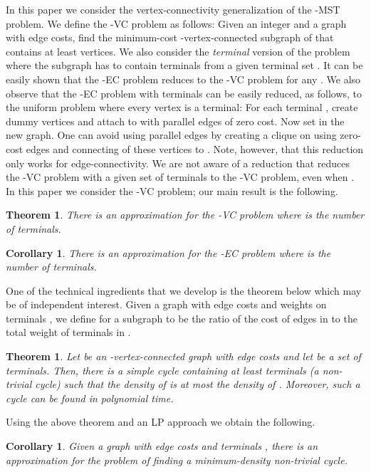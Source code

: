 \documentclass[11pt]{article}
\newtheorem{theorem}[lemma]{Theorem}
\newtheorem{corollary}[lemma]{Corollary}
\newcommand{\kec}[1]{-{\sc EC} }
\newcommand{\kvc}[1]{-{\sc VC} }
\newcommand{\ke}{\kec{2}}
\newcommand{\kv}{\kvc{2}}
\begin{document}
In this paper we consider the vertex-connectivity generalization of
the -MST problem. We define the \kvc{\lambda} problem as follows:
Given an integer  and a graph  with edge costs, find the
minimum-cost -vertex-connected subgraph of  that contains
at least  vertices. We also consider the {\em terminal} version of
the problem where the subgraph has to contain  terminals from a
given terminal set . It can be easily shown that the
\kec{\lambda} problem reduces to the \kvc{\lambda} problem for any . We also observe that the \kec{\lambda} problem with terminals
can be easily reduced, as follows, to the uniform problem where every
vertex is a terminal: For each terminal , create  dummy
vertices  and attach  to  with
 parallel edges of zero cost. Now set  in the new
graph. One can avoid using parallel edges by creating a clique on
 using zero-cost edges and connecting 
of these vertices to . Note, however, that this reduction only
works for edge-connectivity. We are not aware of a reduction that
reduces the \kvc{\lambda} problem with a given set of terminals to the
\kvc{\lambda} problem, even when . In this paper we
consider the \kv problem; our main result is the following.

\begin{theorem}
  \label{thm:kv}
  There is an  approximation for the \kv
  problem where  is the number of terminals.
\end{theorem}

\begin{corollary}
  \label{cor:ke}
  There is an  approximation for the \ke
  problem where  is the number of terminals.
\end{corollary}

One of the technical ingredients that we develop is the theorem below
which may be of independent interest. Given a graph  with edge costs
and weights on terminals , we define  for a
subgraph  to be the ratio of the cost of edges in  to the total
weight of terminals in .

\begin{theorem}
  \label{thm:cycle}
  Let  be an -vertex-connected graph with edge costs and let  be a set of terminals. Then, there is a simple cycle 
  containing at least  terminals (a non-trivial cycle) such that
  the density of  is at most the density of . Moreover, such a
  cycle can be found in polynomial time.
\end{theorem}

Using the above theorem and an LP approach we obtain the following. 
\begin{corollary}
  \label{cor:cycle}
  Given a graph  with edge costs and  terminals
  , there is an  approximation for the
  problem of finding a minimum-density non-trivial cycle.
\end{corollary}
\end{document}
